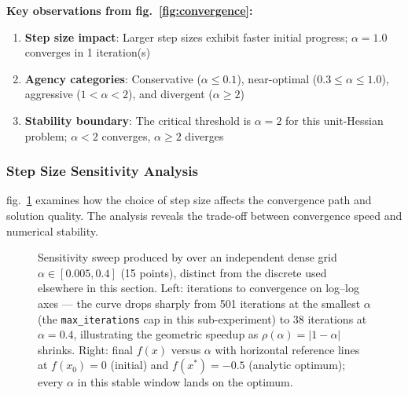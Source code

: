 \documentclass[
]{article}
\makeatletter
\newcommand*\pandocbounded[1]{%
  \sbox\pandoc@box{#1}%
  \Gscale@div\@tempa{\textheight}{\dimexpr\ht\pandoc@box+\dp\pandoc@box\relax}%
  \Gscale@div\@tempb{\linewidth}{\wd\pandoc@box}%
  \ifdim\@tempb\p@<\@tempa\p@\let\@tempa\@tempb\fi%
  \ifdim\@tempa\p@<\p@\scalebox{\@tempa}{\usebox\pandoc@box}%
  \else\usebox{\pandoc@box}%
  \fi%
}
\providecommand{\tightlist}{%
  \setlength{\itemsep}{0pt}\setlength{\parskip}{0pt}}
\makeatother
\begin{document}
\textbf{Key observations from fig.~\ref{fig:convergence}:}

\begin{enumerate}
\def\labelenumi{\arabic{enumi}.}
\tightlist
\item
  \textbf{Step size impact}: Larger step sizes exhibit faster initial
  progress; \(\alpha = 1.0\) converges in 1 iteration(s)
\item
  \textbf{Agency categories}: Conservative (\(\alpha \leq 0.1\)),
  near-optimal (\(0.3 \leq \alpha \leq 1.0\)), aggressive
  (\(1 < \alpha < 2\)), and divergent (\(\alpha \geq 2\))
\item
  \textbf{Stability boundary}: The critical threshold is \(\alpha = 2\)
  for this unit-Hessian problem; \(\alpha < 2\) converges,
  \(\alpha \geq 2\) diverges
\end{enumerate}

\subsubsection{Step Size Sensitivity
Analysis}\label{step-size-sensitivity-analysis}

fig.~\ref{fig:step_sensitivity} examines how the choice of step size
affects the convergence path and solution quality. The analysis reveals
the trade-off between convergence speed and numerical stability.

\begin{figure}
\centering
\pandocbounded{\includegraphics[keepaspectratio,alt={Sensitivity sweep produced by generate\_step\_size\_sensitivity\_plot() over an independent dense grid \textbackslash alpha \textbackslash in {[}0.005, 0.4{]} (15 points), distinct from the discrete experiment.step\_sizes used elsewhere in this section. Left: iterations to convergence on log--log axes --- the curve drops sharply from 501 iterations at the smallest \textbackslash alpha (the max\_iterations cap in this sub-experiment) to 38 iterations at \textbackslash alpha=0.4, illustrating the geometric speedup as \textbackslash rho(\textbackslash alpha)=|1-\textbackslash alpha|{} shrinks. Right: final f(x) versus \textbackslash alpha with horizontal reference lines at f(x\_0)=0 (initial) and f(x\^{}\textbackslash ast)=-0.5 (analytic optimum); every \textbackslash alpha in this stable window lands on the optimum.}]{../figures/step_size_sensitivity.png}}
\caption{Sensitivity sweep produced by
\protect{} over an
independent dense grid \(\alpha \in [0.005, 0.4]\) (15 points), distinct
from the discrete \protect{} used elsewhere
in this section. Left: iterations to convergence on log--log axes ---
the curve drops sharply from 501 iterations at the smallest \(\alpha\)
(the \protect\texttt{max\_iterations} cap in this sub-experiment) to 38
iterations at \(\alpha=0.4\), illustrating the geometric speedup as
\(\rho(\alpha)=|1-\alpha|\) shrinks. Right: final \(f(x)\) versus
\(\alpha\) with horizontal reference lines at \(f(x_0)=0\) (initial) and
\(f(x^\ast)=-0.5\) (analytic optimum); every \(\alpha\) in this stable
window lands on the optimum.}\label{fig:step_sensitivity}
\end{figure}
\end{document}

